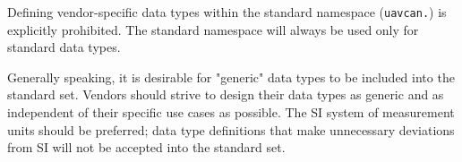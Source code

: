 Defining vendor-specific data types within the standard namespace (\verb|uavcan.|) is explicitly prohibited.
The standard namespace will always be used only for standard data types.

Generally speaking, it is desirable for "generic" data types to be included into the standard set.
Vendors should strive to design their data types as generic and as independent of their specific use
cases as possible.
The SI system of measurement units should be preferred;
data type definitions that make unnecessary deviations from SI will not be accepted into the standard set.

